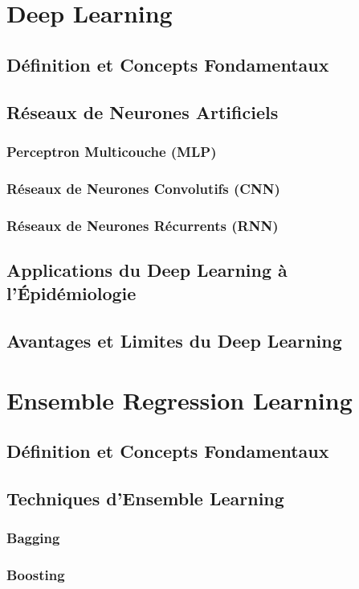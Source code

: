 \section{Deep Learning}
\subsection{Définition et Concepts Fondamentaux}
\subsection{Réseaux de Neurones Artificiels}
\subsubsection{Perceptron Multicouche (MLP)}
\subsubsection{Réseaux de Neurones Convolutifs (CNN)}
\subsubsection{Réseaux de Neurones Récurrents (RNN)}
\subsection{Applications du Deep Learning à l'Épidémiologie}
\subsection{Avantages et Limites du Deep Learning}

\section{Ensemble Regression Learning}
\subsection{Définition et Concepts Fondamentaux}
\subsection{Techniques d'Ensemble Learning}
\subsubsection{Bagging}
\subsubsection{Boosting}
